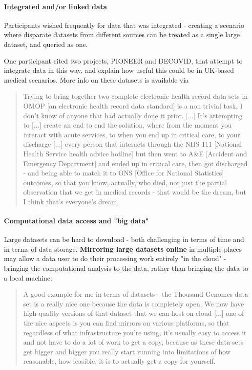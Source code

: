 \documentclass{CUP-JNL-DAP}%
\begin{document}
\paragraph{Integrated and/or linked data}
Participants wished frequently for data that was integrated - creating a scenario where disparate datasets from different sources can be treated as a single large dataset, and queried as one. 

One participant cited two projects, PIONEER and DECOVID, that attempt to integrate data in this way, and explain how useful this could be in UK-based medical scenarios. More info on these datasets is available via \cite{pioneer}

\blockquote{Trying to bring together two complete electronic health record data sets in OMOP [an electronic health record data standard] is a non trivial task, I don't know of anyone that had actually done it prior. [...] It's attempting to [...] create an end to end the solution, where from the moment you interact with acute services, to when you end up in critical care, to your discharge [...] every person that interacts through the NHS 111 [National Health Service health advice hotline] but then went to A\&E [Accident and Emergency Department] and ended up in critical care, then got discharged - and being able to match it to ONS [Office for National Statistics] outcomes, so that you know, actually, who died, not just the partial observation that we get in medical records - that would be the dream, but I think that's everyone's dream.}

\paragraph{Computational data access and "big data"}
Large datasets can be hard to download - both challenging in terms of time and in terms of data storage. \textbf{Mirroring large datasets online} in multiple places may allow a data user to do their processing work entirely "in the cloud" - bringing the computational analysis to the data, rather than bringing the data to a local machine: 

\blockquote{A good example for me in terms of datasets - the Thousand Genomes data set is a really nice one because the data is completely open.  We now have high-quality versions of that dataset that we can host on cloud [...] one of the nice aspects is you can find mirrors on various platforms, so that regardless of what infrastructure you're using, it's usually easy to access it and not have to do a lot of work to get a copy, because as these data sets get bigger and bigger you really start running into limitations of how reasonable, how feasible, it is to actually get a copy for yourself.}
\end{document}
